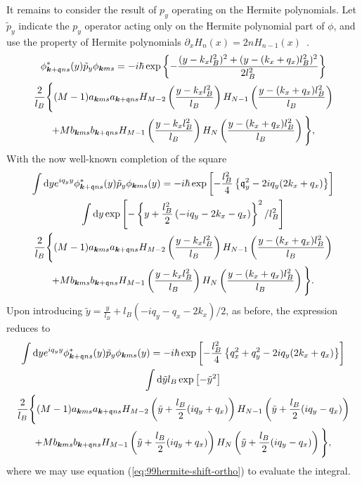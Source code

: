 It remains to consider the result of $p_y$ operating on the Hermite polynomials.
Let $\tilde{p}_y$ indicate the $p_y$ operator acting only on the Hermite polynomial part of $\phi $, and use the property of Hermite polynomials $\partial _x H_n(x) = 2 n H_{n-1}(x)$~\cite[Eq.~18.9.25]{NIST:DLMF}.
\begin{multline}
      \phi ^{*}_{\bm{k}+\mathfrak{q}ns}(y) \tilde{p}_y \phi _{\bm{k}ms} = 
    -i \hbar \exp \left\{
      - \frac{(y-k_xl_B^2)^2 + (y-(k_x + q_x) l_B^2)^2}{2 l_B^2}
    \right\}\\
    \frac{2}{l_B}\Bigg\{
      (M-1) a _{\bm{k} ms}a _{\bm{k}+\mathfrak{q} ns} H_{M-2}\left( \frac{y-k_x l_B^2}{l_B} \right) H_{N-1} \left( \frac{y - (k_x+q_x)l_B^2}{l_B} \right)\\
      + M b _{\bm{k} ms} b _{\bm{k}+\mathfrak{q} ns} H_{M-1} \left( \frac{y - k_xl_B^2}{l_B} \right) H_N \left( \frac{y - (k_x+q_x)l_B^2}{l_B} \right)
    \Bigg\},
\end{multline}
With the now well-known completion of the square
\begin{multline}
  \int \mathrm{d}y e^{iq_y y} \phi ^{*}_{\bm{k}+\mathfrak{q} ns}(y) \tilde{p}_y \phi _{\bm{k} ms}(y) =
  -i\hbar 
  \exp \left[ -\frac{l_B^2}{4} \left\{ \mathfrak{q}_y^2 - 2iq_y ( 2k_x + q_x) \right\} \right]\\
  \int \mathrm{d}y
  \exp \left[
    - \left\{
      y + \frac{l_B^2}{2} \left( -iq_y - 2k_x - q_x \right)
    \right\} ^2
    / l_B^2
  \right]\\
  \frac{2}{l_B}\Bigg\{
  (M-1) a _{\bm{k}ms}a _{\bm{k}+\mathfrak{q} ns} H_{M-2}\left( \frac{y-k_x l_B^2}{l_B} \right) H_{N-1} \left( \frac{y - (k_x+q_x)l_B^2}{l_B} \right)\\
  + M b _{\bm{k} ms} b _{\bm{k}+\mathfrak{q} ns} H_{M-1} \left( \frac{y - k_xl_B^2}{l_B} \right) H_N \left( \frac{y - (k_x+q_x)l_B^2}{l_B} \right)
  \Bigg\}.
\end{multline}
Upon introducing $\tilde{y} = \frac{y}{l_B} + l_B( -iq_y - q_x - 2k_x) / 2$, as before, the expression reduces to
\begin{multline}
  \int \mathrm{d}y e^{iq_y y} \phi ^{*}_{\bm{k}+\mathfrak{q} ns}(y) \tilde{p}_y \phi _{\bm{k} ms}(y) =
  -i\hbar 
  \exp \left[ -\frac{l_B^2}{4} \left\{ q_x^2 + q_y^2 - 2iq_y ( 2k_x + q_x) \right\} \right]\\
  \int \mathrm{d}\tilde{y} l_B
  \exp \left[
    - \tilde{y}^2
  \right]\\
  \frac{2}{l_B}\Bigg\{
  (M-1) a _{\bm{k}ms}a _{\bm{k}+\mathfrak{q} ns}
  H_{M-2}\left( \tilde{y} + \frac{l_B}{2}(iq_y + q_x) \right)
  H_{N-1} \left( \tilde{y} + \frac{l_B}{2}(iq_y - q_x) \right)\\
  + M b _{\bm{k} ms} b _{\bm{k}+\mathfrak{q} ns}
  H_{M-1} \left( \tilde{y} + \frac{l_B}{2}(iq_y + q_x)\right)
  H_N \left( \tilde{y} + \frac{l_B}{2}(iq_y - q_x) \right)
  \Bigg\},
\end{multline}
where we may use equation (\ref{eq:99hermite-shift-ortho}) to evaluate the integral.

